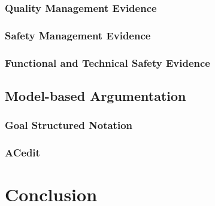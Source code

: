 \documentclass{template/openetcs_report}
\begin{document}
\subsection{Quality Management Evidence}

\subsection{Safety Management Evidence}

\subsection{Functional and Technical Safety Evidence}


\section{Model-based Argumentation}
\subsection{Goal Structured Notation}
\subsection{ACedit}





 
\chapter{Conclusion}








\end{document}
